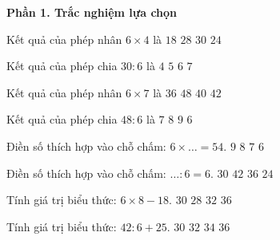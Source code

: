 \textbf{Phần 1. Trắc nghiệm lựa chọn}

\begin{ex} %
Kết quả của phép nhân $6 \times 4$ là
\choice
{$18$}
{$28$}
{$30$}
{\True $24$}
\end{ex}

\begin{ex} %
Kết quả của phép chia $30 : 6$ là
\choice
{$4$}
{\True $5$}
{$6$}
{$7$}
\end{ex}

\begin{ex} %
Kết quả của phép nhân $6 \times 7$ là
\choice
{$36$}
{$48$}
{$40$}
{\True $42$}
\end{ex}

\begin{ex} %
Kết quả của phép chia $48 : 6$ là
\choice
{$7$}
{\True $8$}
{$9$}
{$6$}
\end{ex}

\begin{ex} %
Điền số thích hợp vào chỗ chấm: $6 \times \dots = 54$.
\choice
{\True $9$}
{$8$}
{$7$}
{$6$}
\end{ex}

\begin{ex} %
Điền số thích hợp vào chỗ chấm: $\dots : 6 = 6$.
\choice
{$30$}
{$42$}
{\True $36$}
{$24$}
\end{ex}

\begin{ex} %
Tính giá trị biểu thức: $6 \times 8 - 18$.
\choice
{\True $30$}
{$28$}
{$32$}
{$36$}
\end{ex}

\begin{ex} %
Tính giá trị biểu thức: $42 : 6 + 25$.
\choice
{$30$}
{\True $32$}
{$34$}
{$36$}
\end{ex}

